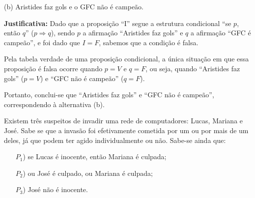 \documentclass[12pt,letterpaper, onecolumn]{exam}
\begin{document}
\begin{questions}

    \begin{solution}
        (b) Aristides faz gols e o GFC não é campeão.
        
        \textbf{Justificativa:}
            Dado que a proposição “I” segue a estrutura condicional “se \(p\), então \(q\)” (\( p \Rightarrow q \)), sendo \( p \) a afirmação “Aristides faz gols” e \( q \) a afirmação “GFC é campeão”, e foi dado que \( I = F \), sabemos que a condição é falsa.
            
            Pela tabela verdade de uma proposição condicional, a única situação em que essa proposição é falsa ocorre quando \( p = V \) e \( q = F \), ou seja, quando “Aristides faz gols” (\( p = V \)) e “GFC não é campeão” (\( q = F \)).
            
            Portanto, conclui-se que “Aristides faz gols” e “GFC não é campeão”, correspondendo à alternativa (b).
    \end{solution}

    \pagebreak
    
    \question[q8] Existem três suspeitos de invadir uma rede de computadores: Lucas, Mariana e José. Sabe se que a invasão foi efetivamente cometida por um ou por mais de um deles, já que podem ter agido individualmente ou não. Sabe-se ainda que:
        
        \begin{enumerate}
            \item[\(P_1\))] se Lucas é inocente, então Mariana é culpada;
            \item[\(P_2\))] ou José é culpado, ou Mariana é culpada;
            \item[\(P_3\))] José não é inocente.
        \end{enumerate}
        

\end{questions}
\end{document}
